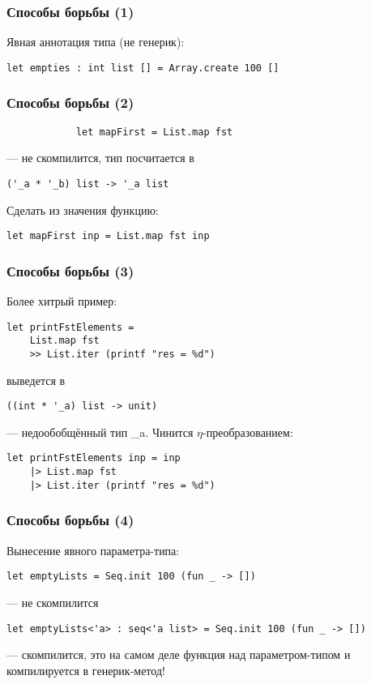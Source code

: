\documentclass[xetex,mathserif,serif]{beamer}
\begin{document}
    \begin{frame}[fragile]
        \frametitle{Способы борьбы (1)}
        Явная аннотация типа (не генерик):
        \begin{verbatim}
let empties : int list [] = Array.create 100 []
        \end{verbatim}
    \end{frame}

    \begin{frame}[fragile]
        \frametitle{Способы борьбы (2)}
        \begin{verbatim}
            let mapFirst = List.map fst
        \end{verbatim}
        --- не скомпилится, тип посчитается в 
        \begin{verbatim}
('_a * '_b) list -> '_a list
        \end{verbatim}

        \vspace{5mm}

        Сделать из значения функцию:
        \begin{verbatim}
let mapFirst inp = List.map fst inp
        \end{verbatim}
    \end{frame}

    \begin{frame}[fragile]
        \frametitle{Способы борьбы (3)}
        Более хитрый пример:
        \begin{verbatim}
let printFstElements = 
    List.map fst
    >> List.iter (printf "res = %d")
        \end{verbatim}
        выведется в 
        \begin{verbatim}
((int * '_a) list -> unit)    
        \end{verbatim}
        --- недообобщённый тип \_a. Чинится $\eta$-преобразованием:
        \begin{verbatim}
let printFstElements inp = inp
    |> List.map fst
    |> List.iter (printf "res = %d")
        \end{verbatim}
    \end{frame}

    \begin{frame}[fragile]
        \frametitle{Способы борьбы (4)}
        Вынесение явного параметра-типа:
        \begin{verbatim}
let emptyLists = Seq.init 100 (fun _ -> [])
        \end{verbatim}
        --- не скомпилится
        \vspace{5mm}
        \begin{verbatim}
let emptyLists<'a> : seq<'a list> = Seq.init 100 (fun _ -> [])
        \end{verbatim}
        --- скомпилится, это на самом деле функция над параметром-типом и компилируется в генерик-метод!
    \end{frame}
\end{document}
